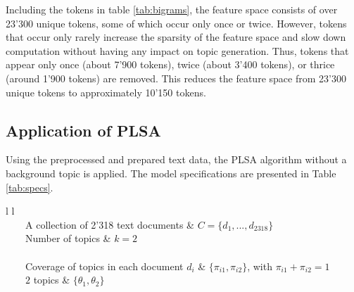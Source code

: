 \documentclass[11pt,a4paper,english,oneside]{book}
\newcommand{\tabitem}{~~\llap{\textbullet}~~}
\numberwithin{equation}{chapter}
\begin{document}
Including the tokens in table \ref{tab:bigrams}, the feature space consists of over 23'300 unique tokens, some of which occur only once or twice. However, tokens that occur only rarely increase the sparsity of the feature space and slow down computation without having any impact on topic generation. Thus, tokens that appear only once (about 7'900 tokens), twice (about 3'400 tokens), or thrice (around 1'900 tokens) are removed. This reduces the feature space from 23'300 unique tokens to approximately 10'150 tokens. 


\subsection{Application of PLSA}\label{appPLSA}

Using the preprocessed and prepared text data, the PLSA algorithm without a background topic is applied. The model specifications are presented in Table \ref{tab:specs}.

\begin{table}[h] %
	\centering %
	\begin{tabular}{ l  l  } %
		\toprule %
		 \\
		\midrule %
		\tabitem A collection of 2'318  text documents & $C=\{d_1,...,d_{2318}\}$ \\
		\tabitem Number of topics & $k = 2$ \\
		\midrule
		 \\
		\midrule
		\tabitem Coverage of topics in each document $d_i$ & $\{\pi_{i1}, \pi_{i2}\}$, with $\pi_{i1}+\pi_{i2}=1$\\
		\tabitem $2$ topics & $\{\theta_1, \theta_2\}$\\ %
		\bottomrule %
	\end{tabular}
	\caption{Specification of PLSA model.} %
	\label{tab:specs} %
\end{table}
\end{document}
